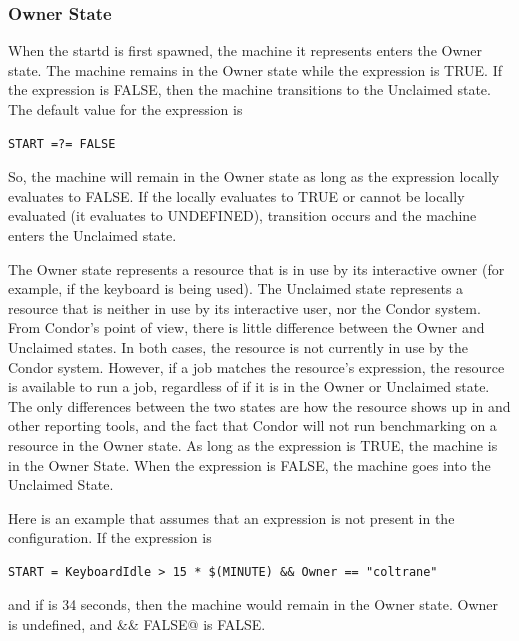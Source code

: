 \subsubsection{\label{sec:Owner-State}
Owner State}

When the startd is first spawned, the machine it represents enters the
Owner state. 
The machine remains in the Owner state while the
expression  is TRUE.
If the  expression is FALSE,
then the machine transitions to the Unclaimed state.
The default value for the 
 expression is 
\begin{verbatim}
START =?= FALSE
\end{verbatim}
So,
the machine will remain in the Owner state as long as the 
expression locally evaluates to FALSE.
If the  locally evaluates to TRUE or cannot be locally
evaluated (it evaluates to UNDEFINED), transition 
occurs and the machine enters the Unclaimed state.

The Owner state represents a resource that is in use by its
interactive owner (for example, if the keyboard is being used).
The Unclaimed state represents a resource that is neither in use by
its interactive user, nor the Condor system.
From Condor's point of view, there is little difference between the
Owner and Unclaimed states.
In both cases, the resource is not currently in use by the Condor
system.
However, if a job matches the resource's  expression, the
resource is available to run a job, regardless of if it is in the
Owner or Unclaimed state.
The only differences between the two states are how the resource shows
up in  and other reporting tools, and the fact that
Condor will not run benchmarking on a resource in the Owner state.
As long as the  expression is TRUE, the machine is
in the Owner State.
When the  expression is FALSE, the machine goes into
the Unclaimed State.

Here is an example that assumes that an 
expression is not present in the configuration.
If the  expression is
\begin{verbatim}
START = KeyboardIdle > 15 * $(MINUTE) && Owner == "coltrane" 
\end{verbatim}
and if  is 34 seconds,
then the machine would remain in the Owner state.
Owner is undefined, and
\verb@anything && FALSE@ is FALSE.

